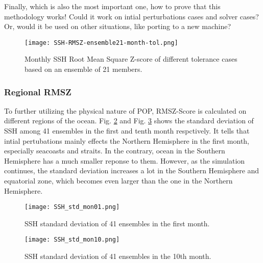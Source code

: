 \documentclass{sig-alternate}
\begin{document}
Finally, which is also the most important one, how to prove that this methodology works! Could it work on intial perturbations cases and solver cases? Or, would it be used on other situations, like porting to a new machine? 

\begin{figure}
\begin{center}
\texttt{[image: SSH-RMSZ-ensemble21-month-tol.png]}
\end{center}
\caption[] {Monthly SSH Root Mean Square Z-score of different tolerance cases based on an ensemble of 21 members.}
\label{fig:ssh_rmsz_t21}
\end{figure}

\subsubsection{Regional RMSZ}
To further utilizing the physical nature of POP, RMSZ-Score is calculated on different regions of the ocean. 
Fig. \ref{fig:ssh_std_01} and Fig. \ref{fig:ssh_std_10} shows the standard deviation of SSH among 41 ensembles in the first and tenth month respctively. 
It tells that intial pertubations mainly effects the Northern Hemisphere in the first month, especially seacoasts and straits. 
In the contrary, ocean in the Southern Hemisphere has a much smaller reponse to them.
However, as the simulation continues, the standard deviation increases a lot in the Southern Hemisphere and equatorial zone, which becomes even larger than the one in the Northern Hemisphere. 

\begin{figure}
\begin{center}
\texttt{[image: SSH\_std\_mon01.png]}
\end{center}
\caption[] {SSH standard deviation of 41 ensembles in the first month.}
\label{fig:ssh_std_01}
\end{figure}

\begin{figure}
\begin{center}
\texttt{[image: SSH\_std\_mon10.png]}
\end{center}
\caption[] {SSH standard deviation of 41 ensembles in the 10th month.}
\label{fig:ssh_std_10}
\end{figure}
\end{document}
